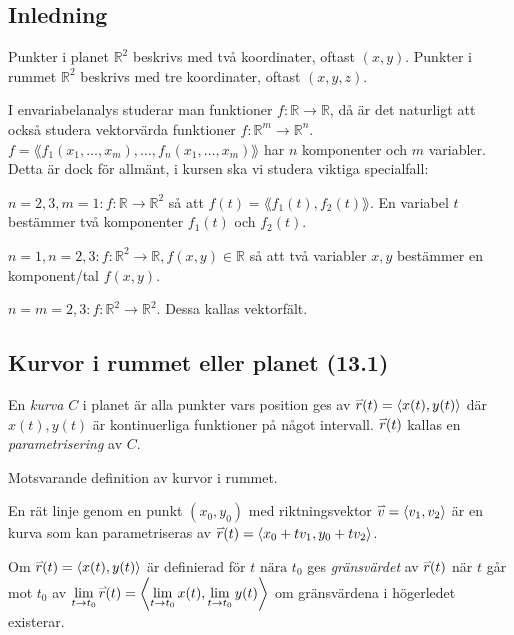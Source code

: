 \documentclass[a4paper]{article}
\begin{document}
\providecommand\fname{}
\renewcommand\fname{19-09-03}

\subsection{Inledning}
Punkter i planet \(
    \mathbb{R}^2
\) beskrivs med två koordinater, oftast \(
    (x,y)
\). Punkter i rummet \(
    \mathbb{R}^2
\) beskrivs med tre koordinater, oftast \(
    (x,y,z)
\). 

I envariabelanalys studerar man funktioner \(
    f: \mathbb{R} \to  \mathbb{R}
\), då är det naturligt att också studera vektorvärda funktioner \(
    f: \mathbb{R}^m \to  \mathbb{R}^n
\). \(
    f = \lang f_1(x_1, \dots, x_m), \dots, f_n(x_1, \dots, x_m)\rang 
\) har \(
    n
\) komponenter och \(
    m
\) variabler. Detta är dock för allmänt, 
i kursen ska vi studera viktiga specialfall: 

\(
    n = 2,3, m = 1: f:\mathbb{R} \to  \mathbb{R}^2 
\) så att \(
    f(t)=\lang f_1(t), f_2(t)\rang 
\). En variabel \(
    t
\) bestämmer två komponenter \(
    f_1(t)
\) och \(
    f_2(t)
\).

\(
    n = 1, n = 2,3: f: \mathbb{R}^2 \to  \mathbb{R}, f(x,y) \in \mathbb{R}
\) så att två variabler \(
    x,y
\) bestämmer en komponent/tal \(
    f(x,y)
\). 

\(
    n = m = 2,3: f:\mathbb{R}^2 \to  \mathbb{R}^2
\). Dessa kallas vektorfält.

\subsection{Kurvor i rummet eller planet (13.1)}
\begin{defn}
En \emph{kurva} \(
    C
\) i planet är alla punkter vars position ges av \(
    \accentset{\rightharpoonup}{r}(t) = \left\langle x(t),y(t)\right\rangle 
\) där \(
    x(t), y(t)
\) är kontinuerliga funktioner på något intervall.
\(
    \accentset{\rightharpoonup}{r}(t) 
\) kallas en \emph{parametrisering} av \(
    C
\). 
\end{defn}

Motsvarande definition av kurvor i rummet.

\begin{ex}
En rät linje genom en punkt \(
    (x_0,y_0)
\) med riktningsvektor \(
    \accentset{\rightharpoonup}{v} = \left\langle v_1,v_2\right\rangle  
\) är en kurva som kan parametriseras av \(
    \accentset{\rightharpoonup}{r}(t) = \left\langle x_0+tv_1, y_0+tv_2\right\rangle
\).
\end{ex}

Om \(
    \accentset{\rightharpoonup}{r}(t) = \left\langle x(t), y(t)\right\rangle 
\) är definierad för \(
    t \text{ nära } t_0
\) ges \emph{gränsvärdet} av \(
    \accentset{\rightharpoonup}{r}(t) 
\) när \(
    t
\) går mot \(
    t_0
\) av \(
    \displaystyle\lim_{t \to  t_0} \accentset{\rightharpoonup}{r} (t) = \left\langle \displaystyle\lim_{t \to  t_0} x(t), \displaystyle\lim_{t \to  t_0} y(t)\right\rangle
\) om gränsvärdena i högerledet existerar.
\end{document}
